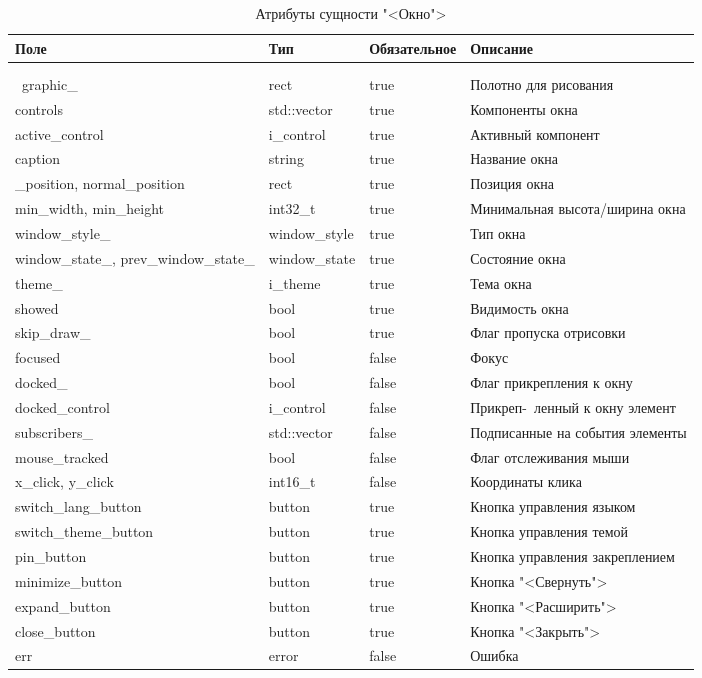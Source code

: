 \begin{xltabular}{\textwidth}{|l|l|p{1.7cm}|X|}
	\caption{Атрибуты сущности "<Окно">\label{window_a:table}}\\ \hline
	\centrow Поле & \centrow Тип & \centrow Обяза\-тельное & \centrow Описание \\ \hline
	 &  &  &  \\ \hline
	\endfirsthead
	 &  &  &  \\ \hline
	\finishhead
	\ graphic{\_} & rect & true & Полотно для рисования \\ \hline
	controls & std::vector & true & Компоненты окна \\ \hline
	active{\_}control & i{\_}control & true & Активный компонент \\ \hline
	caption & string & true & Название окна \\ \hline
	{\_}position, normal{\_}position & rect & true & Позиция окна \\ \hline
	min{\_}width, min{\_}height & int32{\_}t & true & Минимальная высота/ширина окна \\ \hline
	window{\_}style{\_} &  window{\_}style & true & Тип окна \\ \hline
	window{\_}state{\_}, prev{\_}window{\_}state{\_} & window{\_}state & true & Состояние окна \\ \hline
	theme{\_} & i{\_}theme & true & Тема окна \\ \hline
	showed & bool & true & Видимость окна \\ \hline  
	skip{\_}draw{\_} & bool & true & Флаг пропуска отрисовки \\ \hline
	focused & bool & false & Фокус\\ \hline 
	docked{\_} & bool & false & Флаг прикрепления к окну \\ \hline 
	docked{\_}control & i{\_}control & false & Прикреп-\ ленный к окну элемент \\ \hline 
	subscribers{\_} & std::vector & false & Подписанные на события элементы \\ \hline
	mouse{\_}tracked & bool & false & Флаг отслеживания мыши \\ \hline
	x{\_}click, y{\_}click & int16{\_}t & false & Координаты клика \\ \hline 
	switch{\_}lang{\_}button & button & true & Кнопка управления языком \\ \hline
	switch{\_}theme{\_}button & button & true & Кнопка управления темой \\ \hline
	pin{\_}button & button & true & Кнопка управления закреплением \\ \hline
	minimize{\_}button & button & true & Кнопка "<Свернуть"> \\ \hline
	expand{\_}button & button & true & Кнопка "<Расширить"> \\ \hline
	close{\_}button & button & true & Кнопка "<Закрыть"> \\ \hline
	err & error & false & Ошибка
\end{xltabular}

